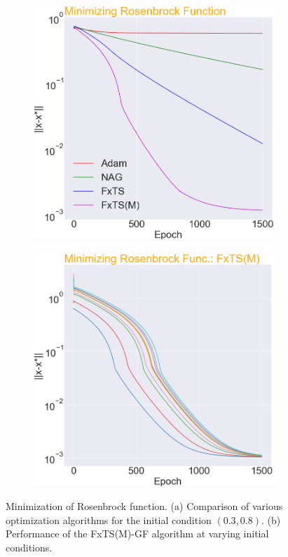 \documentclass[letterpaper]{article}
\begin{document}
\begin{figure}
     \centering
     \begin{subfigure}
         \centering
         \includegraphics[width=0.47\linewidth]{Figures/RF.png}
         \label{fig:sub-first}
     \end{subfigure}
     \hfill
     \begin{subfigure}
         \centering
         \includegraphics[width=0.47\linewidth]{Figures/RF_FxTS_M.png}
         \label{fig:sub-second}
     \end{subfigure}
        \caption{Minimization of Rosenbrock function. (a) Comparison of various optimization algorithms for the initial condition $(0.3,0.8)$. (b) Performance of the FxTS(M)-GF algorithm at varying initial conditions.}
        \label{fig:Rosenbrock}
        \vspace{-1em}
\end{figure}
\end{document}

